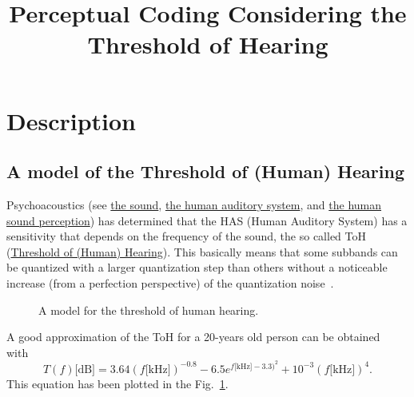 
\title{Perceptual Coding Considering the Threshold of Hearing}

\maketitle

\section{Description}

\subsection{A model of the Threshold of (Human) Hearing}

Psychoacoustics (see
\href{https://vicente-gonzalez-ruiz.github.io/the_sound/}{the sound},
\href{https://vicente-gonzalez-ruiz.github.io/human_auditory_system/}{the
  human auditory system}, and
\href{https://vicente-gonzalez-ruiz.github.io/human_sound_perception/}{the
  human sound perception}) has determined that the HAS (Human Auditory
System) has a sensitivity that depends on the frequency of the sound,
the so called ToH
(\href{https://en.wikipedia.org/wiki/Absolute_threshold_of_hearing}{Threshold
  of (Human) Hearing}). This basically means that some subbands can be
quantized with a larger quantization step than others without a
noticeable increase (from a perfection perspective) of the
quantization noise~\cite{sayood2017introduction}.

\begin{figure}
  \centering
  \caption{A model for the threshold of human hearing.}
  \label{fig:ToHH}
\end{figure}

A good approximation of the ToH for a 20-years old person can be
obtained with~\cite{bosi2003intro}
\begin{equation}
  T(f)\text{[dB]} = 3.64(f\text{[kHz]})^{-0.8} - 6.5e^{f\text{[kHz]}-3.3)^2} + 10^{-3}(f\text{[kHz]})^4.
  \label{eq:ToHH}
\end{equation}
This equation has been plotted in the Fig.~\ref{fig:ToHH}.

